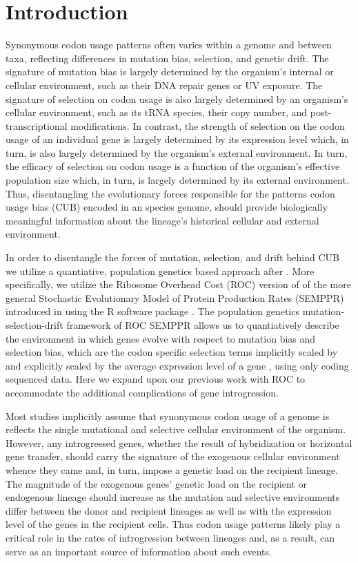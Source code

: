 \documentclass[12pt]{article}
\begin{document}
\section*{Introduction}
Synonymous codon usage patterns often varies within a genome and between taxa, reflecting differences in mutation bias, selection, and genetic drift.
The signature of mutation bias is largely determined by the organism's internal or cellular environment, such as their DNA repair genes or UV exposure.
The signature of selection on codon usage is also largely determined by an organism's cellular environment, such as its tRNA species, their copy number, and post-transcriptional modifications.
In contrast, the strength of selection on the codon usage of an individual gene is largely determined by its expression level which, in turn, is also largely determined by the organism's external environment.
In turn, the efficacy of selection on codon usage is a function of the organism's effective population size \Ne which, in turn, is largely determined by its external environment.
Thus, disentangling the evolutionary forces responsible for the patterns codon usage bias (CUB) encoded in an species genome, should provide biologically meaningful information about the lineage's historical cellular and external environment.



In order to disentangle the forces of mutation, selection, and drift behind CUB we utilize a quantiative, population genetics based approach after \citet{Bulmer1991}.
More specifically, we utilize the Ribosome Overhead Cost (ROC) version of \citet{ShahAndGilchrist2011} of the more general Stochastic Evolutionary Model of Protein Production Rates (SEMPPR) introduced in \citet{Gilchrist2007} using the R software package \citet{LandererEtAl2018}.   
The population genetics mutation-selection-drift framework of ROC SEMPPR allows us to quantiatively describe the environment in which genes evolve with respect to mutation bias and selection bias, which are the codon specific selection terms implicitly scaled by \Ne and explicitly scaled by the average expression level of a gene \citep[See][for more details]{GilchristEtAl2015}, using only coding sequenced data.
Here we expand upon our previous work with ROC to accommodate the additional complications of gene introgression.

Most studies implicitly assume that synonymous codon usage of a genome is reflects the single mutational and selective cellular environment of the organism. 
However, any introgressed genes, whether the result of hybridization or horizontal gene transfer, should carry the signature of the exogenous cellular environment whence they came and, in turn, impose a genetic load on the recipient lineage.
The magnitude of the exogenous genes' genetic load on the recipient or endogenous lineage should increase as the mutation and selective environments differ between the donor and recipient lineages as well as with the expression level of the genes in the recipient cells.
Thus codon usage patterns likely play a critical role in the rates of introgression between lineages and, as a result, can serve as an important source of information about such events.
\end{document}
